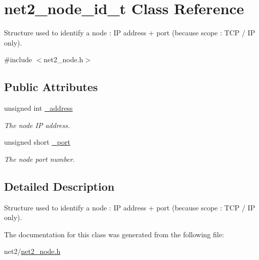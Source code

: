 \hypertarget{structnet2__node__id__t}{\section{net2\-\_\-node\-\_\-id\-\_\-t Class Reference}
\label{structnet2__node__id__t}
}


Structure used to identify a node \-: I\-P address + port (because scope \-: T\-C\-P / I\-P only).  




{\ttfamily \#include $<$net2\-\_\-node.\-h$>$}

\subsection*{Public Attributes}
\begin{DoxyCompactItemize}
\item 
\hypertarget{structnet2__node__id__t_a99c44d35c43abc24127fcee951ae1283}{unsigned int \hyperlink{structnet2__node__id__t_a99c44d35c43abc24127fcee951ae1283}{\-\_\-address}}\label{structnet2__node__id__t_a99c44d35c43abc24127fcee951ae1283}

\begin{DoxyCompactList}\small\item\em The node I\-P address. \end{DoxyCompactList}\item 
\hypertarget{structnet2__node__id__t_a3e5d37dee3738ed77b761c86479f5d23}{unsigned short \hyperlink{structnet2__node__id__t_a3e5d37dee3738ed77b761c86479f5d23}{\-\_\-port}}\label{structnet2__node__id__t_a3e5d37dee3738ed77b761c86479f5d23}

\begin{DoxyCompactList}\small\item\em The node port number. \end{DoxyCompactList}\end{DoxyCompactItemize}


\subsection{Detailed Description}
Structure used to identify a node \-: I\-P address + port (because scope \-: T\-C\-P / I\-P only). 

The documentation for this class was generated from the following file\-:\begin{DoxyCompactItemize}
\item 
net2/\hyperlink{net2__node_8h}{net2\-\_\-node.\-h}\end{DoxyCompactItemize}
